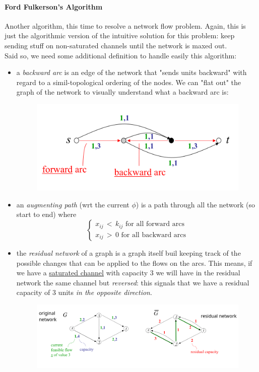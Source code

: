 \documentclass{article}
\begin{document}
				\paragraph{Ford Fulkerson's Algorithm}
					Another algorithm, this time to resolve a network flow problem. Again, this is just the algorithmic version of the intuitive solution for this problem: keep sending stuff on non-saturated channels until the network is maxed out.\\
					Said so, we need some additional definition to handle easily this algorithm:
					\begin{itemize}
						\item a \textit{backward arc} is an edge of the network that "sends units backward" with regard to a simil-topological ordering of the nodes. We can "flat out" the graph of the network to visually understand what a backward arc is:
							\begin{figure}[H]
								\centering
								\includegraphics[width = \textwidth]{./images/BackwardArcs.png}
							\end{figure}
						\item an \textit{augmenting path} (wrt the current $\phi$) is a path through all the network (so start to end) where
							\begin{equation} 
								\begin{cases}
									x_{ij}\, <\, k_{ij} \text{ for all forward arcs}\\
									x_{ij}\, >\, 0 \text{ for all backward arcs}
								\end{cases}
							\end{equation}
						\item the \textit{residual network} of a graph is a graph itself buil keeping track of the possible changes that can be applied to the flows on the arcs. This means, if we have a \underline{saturated channel} with capacity 3 we will have in the residual network the same channel but \textit{reversed}: this signals that we have a residual capacity of 3 units \textit{in the opposite direction}.
							\begin{figure}[H]
								\centering
								\includegraphics[width = \textwidth]{./images/Residual.png}
							\end{figure}
					\end{itemize}
\end{document}
